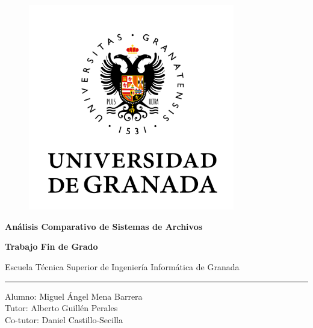 \begin{titlepage}

	\begin{center}

		\vspace*{-3.5cm}

		\begin{figure}[htb]
		\begin{center}
		\includegraphics[width=9cm,keepaspectratio]{doc/assets/images/portada/urg.png}
		\end{center}
		\end{figure}


		\vspace*{0.9cm}
		\textbf{\huge{Análisis Comparativo de Sistemas de Archivos}}
		\vspace*{0.74cm}

		\large{\bfseries Trabajo Fin de Grado}
		\vspace*{0.74cm}


		\small{Escuela Técnica Superior de Ingeniería Informática de Granada } \\
			

		\vspace*{0.42cm}
		\rule{139mm}{0.15mm}
		\vspace*{0.42cm}


		\large{Alumno: Miguel Ángel Mena Barrera} \\
		\large{Tutor: Alberto Guillén Perales}\\
	    \large{Co-tutor: Daniel Castillo-Secilla}
	

\end{center}
\end{titlepage}
